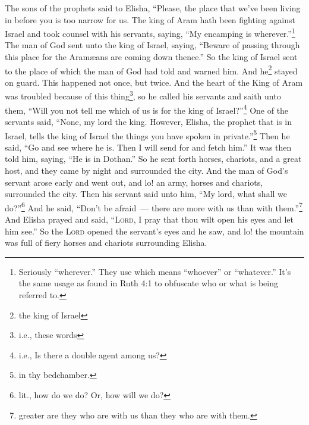 
\begin{inparaenum}
     The sons of the prophets said to Elisha, ``Please, the place that we've been living in before you is too narrow for us.%
     The king of Aram hath been fighting against Israel and took counsel with his servants, saying, ``My encamping is wherever.''\footnote{Seriously ``wherever.'' They use  which means ``whoever'' or ``whatever.'' It's the same usage as found in Ruth 4:1 to obfuscate who or what is being referred to.}%
     The man of God sent unto the king of Israel, saying, ``Beware of passing through this place for the Aram\ae{}ans are coming down thence.''%
     So the king of Israel sent to the place of which the man of God had told and warned him. And he\footnote{the king of Israel} stayed on guard. This happened not once, but twice.%
     And the heart of the King of Aram was troubled because of this thing\footnote{i.e., these words}, so he called his servants and saith unto them, ``Will you not tell me which of us is for the king of Israel?''\footnote{i.e., Is there a double agent among us?}%
     One of the servants said, ``None, my lord the king. However, Elisha, the prophet that is in Israel, tells the king of Israel the things you have spoken in private.''\footnote{in thy bedchamber.}%
     Then he said, ``Go and see where he is. Then I will send for and fetch him.'' It was then told him, saying, ``He is in Dothan.''%
     So he sent forth horses, chariots, and a great host, and they came by night and surrounded the city.%
     And the man of God's servant arose early and went out, and lo! an army, horses and chariots, surrounded the city. Then his servant said unto him, ``My lord, what shall we do?''\footnote{lit., how do we do? Or, how will we do?}%
     And he said, ``Don't be afraid~--- there are more with us than with them.''\footnote{greater are they who are with us than they who are with them.}%
     And Elisha prayed and said, ``\textsc{Lord}, I pray that thou wilt open his eyes and let him see.'' So the \textsc{Lord} opened the servant's eyes and he saw, and lo! the mountain was full of fiery horses and chariots surrounding Elisha.%
\end{inparaenum}
